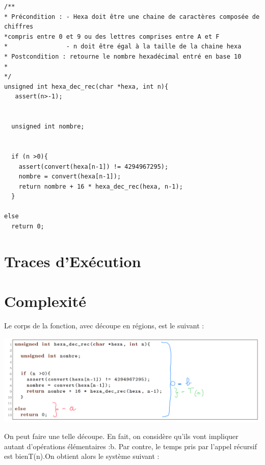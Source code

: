\documentclass[a4paper, 11pt, oneside]{article}
\begin{document}
\begin{lstlisting}[caption={Cas de base}]
/**
* Précondition : - Hexa doit être une chaine de caractères composée de chiffres
*compris entre 0 et 9 ou des lettres comprises entre A et F
*                - n doit être égal à la taille de la chaine hexa
* Postcondition : retourne le nombre hexadécimal entré en base 10
*
*/
unsigned int hexa_dec_rec(char *hexa, int n){
   assert(n>-1);


  unsigned int nombre;


  if (n >0){
    assert(convert(hexa[n-1]) != 4294967295);
    nombre = convert(hexa[n-1]);
    return nombre + 16 * hexa_dec_rec(hexa, n-1);
  }

else
  return 0;

\end{lstlisting}





\section{Traces d'Exécution}\label{traces}
%
%

\newpage
\section{Complexité}\label{complexite}
%
%
Le corps de la fonction, avec découpe en régions, est le suivant :

\vfill
\begin{center} \includegraphics[scale=0.25]{image.png} \end{center}
\vfill

On peut faire une telle découpe. En fait, on considère qu’ils vont impliquer autant d’opérations élémentaires :b. Par contre, le temps pris par l’appel récursif est bienT(n).On obtient alors le système suivant :
\end{document}
